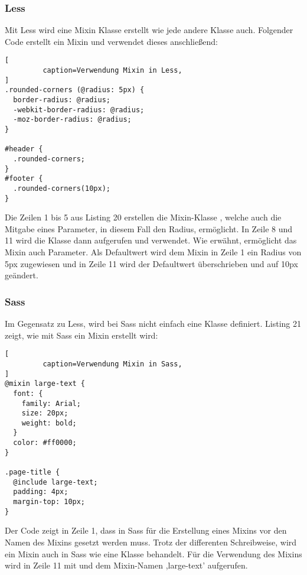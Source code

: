 \subsubsection{Less}
Mit Less wird eine Mixin Klasse erstellt wie jede andere Klasse auch. Folgender Code erstellt ein Mixin und verwendet dieses anschließend:
\begin{lstlisting}[
         caption=Verwendung Mixin in Less,
]
.rounded-corners (@radius: 5px) {
  border-radius: @radius;
  -webkit-border-radius: @radius;
  -moz-border-radius: @radius;
}

#header {
  .rounded-corners;
}
#footer {
  .rounded-corners(10px);
}
\end{lstlisting}
Die Zeilen 1 bis 5 aus Listing 20 erstellen die Mixin-Klasse \glqq{}, welche auch die Mitgabe eines Parameter, in diesem Fall den Radius, ermöglicht. \newline
In Zeile 8 und 11 wird die Klasse dann aufgerufen und verwendet. Wie erwähnt, ermöglicht das Mixin auch Parameter. Als Defaultwert wird dem Mixin in Zeile 1 ein Radius von 5px zugewiesen und in Zeile 11 wird der Defaultwert überschrieben und auf 10px geändert.
\subsubsection{Sass}
Im Gegensatz zu Less, wird bei Sass nicht einfach eine Klasse definiert. Listing 21 zeigt, wie mit Sass ein Mixin erstellt wird:\newpage
\begin{lstlisting}[
         caption=Verwendung Mixin in Sass,
]
@mixin large-text {
  font: {
    family: Arial;
    size: 20px;
    weight: bold;
  }
  color: #ff0000;
}

.page-title {
  @include large-text;
  padding: 4px;
  margin-top: 10px;
}
\end{lstlisting}
Der Code zeigt in Zeile 1, dass in Sass für die Erstellung eines Mixins \glqq{} vor den Namen des Mixins gesetzt werden muss. Trotz der differenten Schreibweise, wird ein Mixin auch in Sass wie eine Klasse behandelt. \newline
Für die Verwendung des Mixins wird in Zeile 11 mit \glqq{} und dem Mixin-Namen ,large-text' aufgerufen. 
